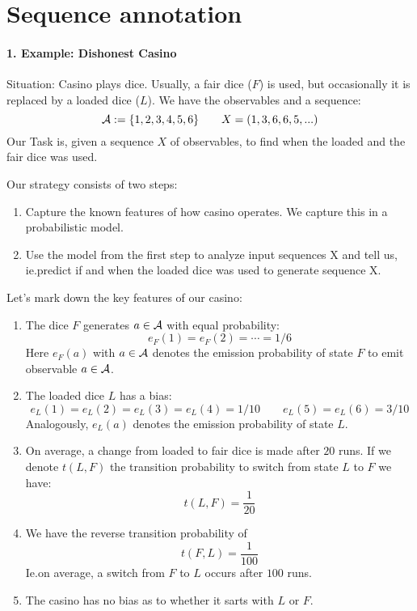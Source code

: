 





\section{Sequence annotation}

\paragraph{1. Example: Dishonest Casino}
Situation: Casino plays dice.  Usually, a fair dice (\(F\)) is used, but
occasionally it is replaced by a loaded dice (\(L\)).  We have the observables
and a sequence:
\[
    \mathcal{A} := \{ 1, 2, 3, 4, 5, 6 \} \qquad
    X = (1,3,6,6,5,...)
\]
Our Task is, given a sequence \(X\) of observables, to find when the loaded and
the fair dice was used.

Our strategy consists of two steps:
\begin{enumerate}[label=Step \arabic*.]
\item Capture the known features of how casino operates.  We capture this in
 a probabilistic model.
\item Use the model from the first step to analyze input sequences X and tell
 us, ie.\@ predict if and when the loaded dice was used to generate sequence
 X.
\end{enumerate}

Let's mark down the key features of our casino:
\begin{enumerate}[label=(\alph*)]
\item The dice \(F\) generates \(a\in\mathcal{A}\) with equal probability:
 \[
   e_F(1) = e_F(2) = \dotsb = 1/6
 \]
 Here \(e_F(a)\) with \(a\in\mathcal{A}\) denotes the emission probability
 of state \(F\) to emit observable \(a\in\mathcal{A}\).
\item The loaded dice \(L\) has a bias:
 \[
   e_L(1) = e_L(2) = e_L(3) = e_L(4) = 1/10 \qquad e_L(5) = e_L(6) = 3/10
 \]
 Analogously, \(e_L(a)\) denotes the emission probability of state \(L\).
 \item On average, a change from loaded to fair dice is made after \(20\)
 runs.  If we denote \(t(L,F)\) the transition probability to switch from state
 \(L\) to \(F\) we have:
 \[
   t(L,F) = \frac{1}{20}
 \]
 \item We have the reverse transition probability of
 \[
   t(F,L) = \frac{1}{100}
 \]
 Ie.\@ on average, a switch from \(F\) to \(L\) occurs after \(100\) runs.
 \item The casino has no bias as to whether it sarts with \(L\) or \(F\).
\end{enumerate}

